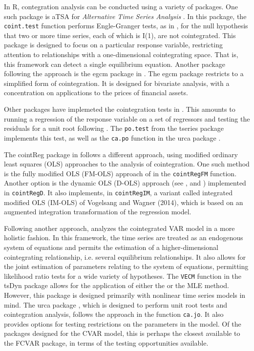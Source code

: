 \documentclass[11pt,letterpaper]{paper}
\newcommand{\pkg}[1]{{\normalfont\fontseries{b}\selectfont #1}}
\let\proglang=\textsf
\let\fct=\texttt
\begin{document}
In \proglang{R}, contegration analysis can be conducted using a variety of packages. 
% 
One such package is \pkg{aTSA} for \emph{Alternative Time Series Analysis} \citep{aTSA2015}. 
In this package, the \fct{coint.test} function performs Engle-Granger tests, as in \citet{EngleGranger1987},  for the null hypothesis that two or more time series, each of which is I(1), are not cointegrated. 
This package is designed to focus on a particular response variable, restricting attention to relationships with a one-dimensional cointegrating space. That is, this framework can detect a single equilibrium equation. 
% 
Another package following the \citet{EngleGranger1987} approach is the \pkg{egcm} package in \citep{egcm2017}. 
The \pkg{egcm} package restricts to a simplified form of cointegration. 
It is designed for bivariate analysis, with a concentration on applications to the prices of financial assets.

Other packages have implemeted the cointegration tests in \citet{PhillipsOuliaris1990}. 
This amounts to running a regression of the response variable on a set of regressors and testing the residuals for a unit root following \cite{PhillipsPerron1988}. 
The \fct{po.test} from the \pkg{tseries} package \citep{tseries2019} implements this test, 
as well as the \fct{ca.po} function in the \pkg{urca} package \citep{urca2016}. 

The \pkg{cointReg} package in \cite{cointReg2016} follows a different approach, using modified ordinary least squares (OLS) approaches to the analysis of cointegration. 
One such method is the fully modified OLS (FM-OLS) approach of \citet{PhillipsHansen1990} in the \fct{cointRegFM} function. 
Another option is the dynamic OLS (D-OLS) approach (see \citet{PhillipsLoretan1991}, \citet{Saikkonen1991} and \citet{StockWatson1993}) implemented in \fct{cointRegD}. 
It also implements, in \fct{cointRegIM}, a variant called integrated modified OLS (IM-OLS) of Vogelsang and Wagner (2014), 
which is based on an augmented integration transformation of the regression model. 

Following another approach, 
\citet{Johansen1995} analyzes the cointegrated VAR model in a more holistic fashion.
In this framework, the time series are treated as an endogenous system of equations and permits the estimation of a higher-dimensional cointegrating relationship, i.e. several equilibrium relationships. 
% 
It also allows for the joint estimation of parameters relating to the system of equations, permitting likelihood ratio tests for a wide variety of hypotheses. 
The \fct{VECM} function in the \pkg{tsDyn} package allows for the application of either the \citet{EngleGranger1987} or the \citet{Johansen1995} MLE method. 
However, this package is designed primarily with nonlinear time series models in mind. 
The \pkg{urca} package \citep{urca2016}, 
which is designed to perform unit root tests and cointegration analysis, 
follows the \citet{Johansen1995} approach in the function \fct{ca.jo}. 
It also provides options for testing restrictions on the parameters in the model. 
Of the packages designed for the CVAR model, this is perhaps the closest available to the \pkg{FCVAR} package, in terms of the testing opportunities available.
\end{document}
